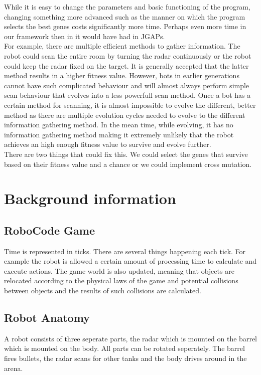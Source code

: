 \documentclass[a4paper,10pt]{article}
\begin{document}
While it is easy to change the parameters and basic functioning of the program, changing something more advanced such as the manner on which the program selects the best genes costs significantly more time. Perhaps even more time in our framework then in it would have had in JGAPs.\\
For example, there are multiple efficient methods to gather information. The robot could scan the entire room by turning the radar continuously or the robot could keep the radar fixed on the target. It is generally accepted that the latter method results in a higher fitness value.
However, bots in earlier generations cannot have such complicated behaviour and will almost always perform simple scan behaviour that evolves into a less powerfull scan method. Once a bot has a certain method for scanning, it is almost impossible to evolve the different, better method as there are multiple evolution cycles needed to evolve to the different information gathering method. In the mean time, while evolving, it has no information gathering method making it extremely unlikely that the robot achieves an high enough fitness value to survive and evolve further.\\

There are two things that could fix this. We could select the genes that survive based on their fitness value and a chance or we could implement cross mutation.

\section{Background information}
\label{bi}
\subsection{RoboCode Game}
Time is represented in ticks. There are several things happening each tick. For example the robot is allowed a certain amount of processing time to calculate and execute actions. The game world is also updated, meaning that objects are relocated according to the physical laws of the game and potential collisions between objects and the results of such collisions are calculated.

\subsection{Robot Anatomy}
A robot consists of three seperate parts, the radar which is mounted on the barrel which is mounted on the body. All parts can be rotated seperately. The barrel fires bullets, the radar scans for other tanks and the body drives around in the arena.
\end{document}
